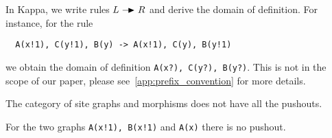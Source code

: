 \begin{example}
In Kappa, we write rules $L\action R$ and derive the domain of definition. For instance, for the rule
\begin{verbatim}
  A(x!1), C(y!1), B(y) -> A(x!1), C(y), B(y!1)
\end{verbatim}
we obtain the domain of definition \verb|A(x?), C(y?), B(y?)|. This is not in the scope of our paper, please see~\autoref{app:prefix_convention} for more details.
\end{example}

The category of site graphs and morphisms does not have all the pushouts. %

\begin{example}
  For the two graphs \verb|A(x!1), B(x!1)| and \verb|A(x)| there is no pushout.
\end{example}

